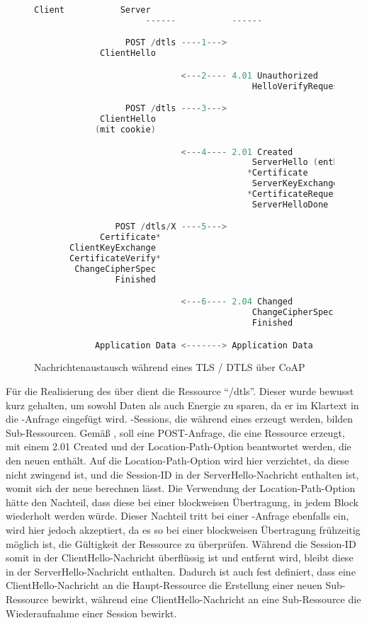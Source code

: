 \begin{figure}[ht]
  \centering
  \begin{lstlisting}[language=c]
                      Client           Server
                      ------           ------

                  POST /dtls ----1--->
             ClientHello

                             <---2---- 4.01 Unauthorized
                                           HelloVerifyRequest

                  POST /dtls ----3--->
             ClientHello
            (mit cookie)

                             <---4---- 2.01 Created
                                           ServerHello (enthält Session X)
                                          *Certificate
                                           ServerKeyExchange
                                          *CertificateRequest
                                           ServerHelloDone

                POST /dtls/X ----5--->
             Certificate*
       ClientKeyExchange
       CertificateVerify*
        ChangeCipherSpec
                Finished

                             <---6---- 2.04 Changed
                                           ChangeCipherSpec
                                           Finished

            Application Data <-------> Application Data
  \end{lstlisting}
  \caption{Nachrichtenaustausch während eines TLS / DTLS  über CoAP}
  \label{fig:coaphandshake}
\end{figure}

Für die Realisierung des  über  dient die Ressource "`/dtls"'. Dieser  wurde bewusst kurz gehalten, um sowohl Daten
als auch Energie zu sparen, da er im Klartext in die -Anfrage eingefügt wird. -Sessions, die während eines  erzeugt
werden, bilden Sub-Ressourcen. Gemäß  \cite[Abschnitt 5.8.2]{draftcoap13}, soll eine POST-Anfrage, die eine Ressource erzeugt, mit einem
2.01 Created und der Location-Path-Option beantwortet werden, die den neuen  enthält. Auf die Location-Path-Option wird hier verzichtet,
da diese nicht zwingend ist, und die Session-ID in der ServerHello-Nachricht enthalten ist, womit sich der neue  berechnen lässt. Die Verwendung
der Location-Path-Option hätte den Nachteil, dass diese bei einer blockweisen Übertragung, in jedem Block wiederholt werden würde. Dieser Nachteil
tritt bei einer -Anfrage ebenfalls ein, wird hier jedoch akzeptiert, da es so bei einer blockweisen Übertragung frühzeitig möglich ist,
die Gültigkeit der Ressource zu überprüfen. Während die Session-ID somit in der ClientHello-Nachricht überflüssig ist und entfernt wird, bleibt diese in der
ServerHello-Nachricht enthalten. Dadurch ist auch fest definiert, dass eine ClientHello-Nachricht an die Haupt-Ressource die Erstellung einer neuen
Sub-Ressource bewirkt, während eine ClientHello-Nachricht an eine Sub-Ressource die Wiederaufnahme einer Session bewirkt.

